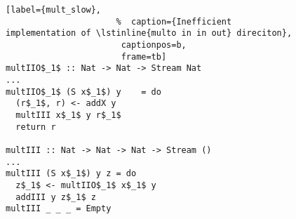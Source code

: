 \begin{figure}[!t]
  \centering
  \begin{minipage}{\columnwidth}
    \begin{lstlisting}[label={mult_slow},
                      %  caption={Inefficient implementation of \lstinline{multo in in out} direciton},
                       captionpos=b,
                       frame=tb]
multIIO$_1$ :: Nat -> Nat -> Stream Nat
...
multIIO$_1$ (S x$_1$) y    = do
  (r$_1$, r) <- addX y
  multIII x$_1$ y r$_1$
  return r

multIII :: Nat -> Nat -> Nat -> Stream ()
...
multIII (S x$_1$) y z = do
  z$_1$ <- multIIO$_1$ x$_1$ y
  addIII y z$_1$ z
multIII _ _ _ = Empty
    \end{lstlisting}
  \end{minipage}
\end{figure}
